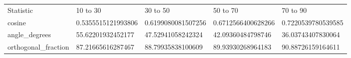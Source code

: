 \begin{tabular}{lllll}
\hline
Statistic & 10 to 30 & 30 to 50 & 50 to 70 & 70 to 90 \\
cosine & 0.5355515121993806 & 0.6199080081507256 & 0.6712566400628266 & 0.7220539780539585 \\
angle\_degrees & 55.62201932452177 & 47.52941058242324 & 42.09360484798746 & 36.03743407830064 \\
orthogonal\_fraction & 87.21665616287467 & 88.79935838100609 & 89.93930268964183 & 90.88726159164611 \\
\hline
\end{tabular}
